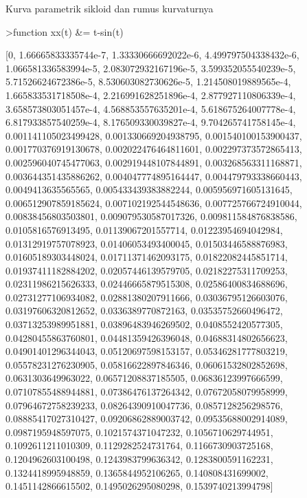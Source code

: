 \documentclass[a4paper,10pt]{article}
\begin{document}
\begin{eulernotebook}
\begin{eulercomment}
Kurva parametrik sikloid dan rumus kurvaturnya
\end{eulercomment}
\begin{eulerprompt}
>function xx(t) &= t-sin(t)
\end{eulerprompt}
\begin{euleroutput}
  
          [0, 1.66665833335744e-7, 1.33330666692022e-6, 
  4.499797504338432e-6, 1.066581336583994e-5, 2.083072932167196e-5, 
  3.599352055540239e-5, 5.71526624672386e-5, 8.530603082730626e-5, 
  1.214508019889565e-4, 1.665833531718508e-4, 2.216991628251896e-4, 
  2.877927110806339e-4, 3.658573803051457e-4, 4.568853557635201e-4, 
  5.618675264007778e-4, 6.817933857540259e-4, 8.176509330039827e-4, 
  9.704265741758145e-4, 0.001141105023499428, 0.001330669204938795, 
  0.001540100153900437, 0.001770376919130678, 0.002022476464811601, 
  0.002297373572865413, 0.002596040745477063, 0.002919448107844891, 
  0.003268563311168871, 0.003644351435886262, 0.004047774895164447, 
  0.004479793338660443, 0.0049413635565565, 0.005433439383882244, 
  0.005956971605131645, 0.006512907859185624, 0.007102192544548636, 
  0.007725766724910044, 0.00838456803503801, 0.009079530587017326, 
  0.009811584876838586, 0.0105816576913495, 0.01139067201557714, 
  0.01223954694042984, 0.01312919757078923, 0.01406053493400045, 
  0.01503446588876983, 0.01605189303448024, 0.01711371462093175, 
  0.01822082445851714, 0.01937411182884202, 0.02057446139579705, 
  0.02182275311709253, 0.02311986215626333, 0.02446665879515308, 
  0.02586400834688696, 0.02731277106934082, 0.02881380207911666, 
  0.03036795126603076, 0.03197606320812652, 0.0336389770872163, 
  0.03535752660496472, 0.03713253989951881, 0.03896483946269502, 
  0.0408552420577305, 0.04280455863760801, 0.04481359426396048, 
  0.04688314802656623, 0.04901401296344043, 0.05120697598153157, 
  0.05346281777803219, 0.05578231276230905, 0.05816622897846346, 
  0.06061532802852698, 0.0631303649963022, 0.06571208837185505, 
  0.06836123997666599, 0.07107855488944881, 0.07386476137264342, 
  0.07672058079958999, 0.07964672758239233, 0.08264390910047736, 
  0.0857128256298576, 0.08885417027310427, 0.09206862889003742, 
  0.09535688002914089, 0.0987195948597075, 0.1021574371047232, 
  0.1056710629744951, 0.1092611211010309, 0.1129282524731764, 
  0.1166730903725168, 0.1204962603100498, 0.1243983799636342, 
  0.1283800591162231, 0.1324418995948859, 0.1365844952106265, 
  0.140808431699002, 0.1451142866615502, 0.1495026295080298, 
  0.1539740213994798]
  

\end{euleroutput}
\end{eulernotebook}
\end{document}
